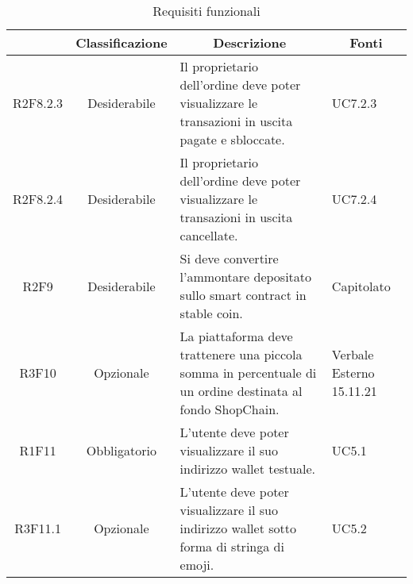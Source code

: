 \begin{table}[H]
    \centering
    \renewcommand{\arraystretch}{1.8}
    \begin{tabular}{c | c | p{6cm} | p{4.1cm}}
        \rowcolor[HTML]{125E28}
        \multicolumn{1}{c}{\color[HTML]{FFFFFF} \textbf{Codice}}            &
        \multicolumn{1}{c}{\color[HTML]{FFFFFF} \textbf{Classificazione}}   &
        \multicolumn{1}{c}{\color[HTML]{FFFFFF} \textbf{Descrizione}}       &
        \multicolumn{1}{c}{\color[HTML]{FFFFFF} \textbf{Fonti}}                                                                                                                                                                    \\
        \hline
        R2F8.2.3                                                            & Desiderabile & Il proprietario dell'ordine deve poter visualizzare le transazioni in uscita pagate e sbloccate.           & UC7.2.3                  \\
        R2F8.2.4                                                            & Desiderabile & Il proprietario dell'ordine deve poter visualizzare le transazioni in uscita cancellate.                   & UC7.2.4                  \\
        R2F9                                                                & Desiderabile & Si deve convertire l'ammontare depositato sullo smart contract in stable coin.                             & Capitolato               \\
        R3F10                                                               & Opzionale    & La piattaforma deve trattenere una piccola somma in percentuale di un ordine destinata al fondo ShopChain. & Verbale Esterno 15.11.21 \\
        R1F11                                                               & Obbligatorio & L'utente deve poter visualizzare il suo indirizzo wallet testuale.                                         & UC5.1                    \\
        R3F11.1                                                             & Opzionale    & L'utente deve poter visualizzare il suo indirizzo wallet sotto forma di stringa di emoji.                  & UC5.2                    \\
    \end{tabular}
    \caption{Requisiti funzionali}
\end{table}

